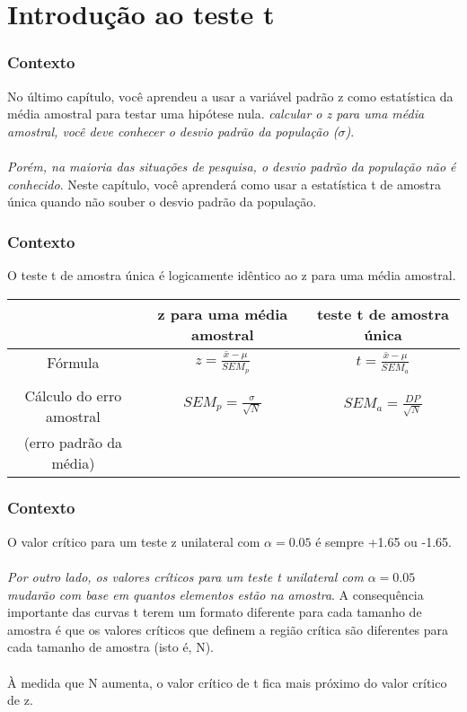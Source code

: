 \documentclass[11pt]{beamer}
\begin{document}
\section{Introdução ao teste t}
\begin{frame}
\frametitle{Contexto}
No último capítulo, você aprendeu a usar a variável padrão z como estatística da média amostral para testar uma hipótese nula. \textit{calcular o z para uma média amostral, você deve conhecer o desvio padrão da população ($\sigma$)}. \\~\\ 
  
\textit{Porém, na maioria das situações de pesquisa, o desvio padrão da população não é conhecido}. Neste capítulo, você aprenderá como usar a estatística t de amostra única quando não souber o desvio padrão da população.
\end{frame}

\begin{frame}
\frametitle{Contexto}
O teste t de amostra única é logicamente idêntico ao z para uma média amostral.

\begin{center}
\small
\begin{tabular}{ccc} 
 \hline
 &	z para uma média amostral & teste t de amostra única\\
 \hline
Fórmula & $z = \frac{\bar{x}-\mu}{SEM_p}$ & $t =\frac{\bar{x}-\mu}{SEM_a}$\\
 &  & \\
Cálculo do erro amostral & $SEM_p = \frac{\sigma}{\sqrt{N}}$ & $SEM_a = \frac{DP}{\sqrt{N}}$\\
(erro padrão da média) &  & \\
 \hline
\end{tabular}
\end{center}

\end{frame}

\begin{frame}
\frametitle{Contexto}
O valor crítico para um teste z unilateral com $\alpha = 0.05$ é sempre +1.65 ou -1.65. 
\\~\\
\textit{Por outro lado, os valores críticos para um teste t unilateral com $\alpha = 0.05$ mudarão com base em quantos elementos estão na amostra}. A consequência importante das curvas t terem um formato diferente para cada tamanho de amostra é que os valores críticos que definem a região crítica são diferentes para cada tamanho de amostra (isto é, N). 
\\~\\
À medida que N aumenta, o valor crítico de t fica mais próximo do valor crítico de z.
\end{frame}
\end{document}
